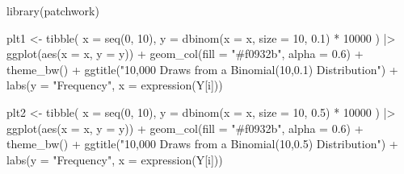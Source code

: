 \documentclass[
  letterpaper,
  DIV=11,
  numbers=noendperiod]{scrreport}
\newenvironment{Shaded}{\begin{snugshade}}{\end{snugshade}}
\newcommand{\AttributeTok}[1]{\textcolor[rgb]{0.40,0.45,0.13}{#1}}
\newcommand{\DecValTok}[1]{\textcolor[rgb]{0.68,0.00,0.00}{#1}}
\newcommand{\FloatTok}[1]{\textcolor[rgb]{0.68,0.00,0.00}{#1}}
\newcommand{\FunctionTok}[1]{\textcolor[rgb]{0.28,0.35,0.67}{#1}}
\newcommand{\NormalTok}[1]{\textcolor[rgb]{0.00,0.23,0.31}{#1}}
\newcommand{\OtherTok}[1]{\textcolor[rgb]{0.00,0.23,0.31}{#1}}
\newcommand{\SpecialCharTok}[1]{\textcolor[rgb]{0.37,0.37,0.37}{#1}}
\newcommand{\StringTok}[1]{\textcolor[rgb]{0.13,0.47,0.30}{#1}}
\begin{document}
\begin{Shaded}
\begin{Highlighting}[]
\FunctionTok{library}\NormalTok{(patchwork)}

\NormalTok{plt1 }\OtherTok{\textless{}{-}} \FunctionTok{tibble}\NormalTok{(}
  \AttributeTok{x =} \FunctionTok{seq}\NormalTok{(}\DecValTok{0}\NormalTok{, }\DecValTok{10}\NormalTok{),}
  \AttributeTok{y =} \FunctionTok{dbinom}\NormalTok{(}\AttributeTok{x =}\NormalTok{ x, }\AttributeTok{size =} \DecValTok{10}\NormalTok{, }\FloatTok{0.1}\NormalTok{) }\SpecialCharTok{*} \DecValTok{10000}
\NormalTok{) }\SpecialCharTok{|\textgreater{}} 
\FunctionTok{ggplot}\NormalTok{(}\FunctionTok{aes}\NormalTok{(}\AttributeTok{x =}\NormalTok{ x, }\AttributeTok{y =}\NormalTok{ y)) }\SpecialCharTok{+} 
\FunctionTok{geom\_col}\NormalTok{(}\AttributeTok{fill =} \StringTok{"\#f0932b"}\NormalTok{, }\AttributeTok{alpha =} \FloatTok{0.6}\NormalTok{) }\SpecialCharTok{+} 
\FunctionTok{theme\_bw}\NormalTok{() }\SpecialCharTok{+} 
\FunctionTok{ggtitle}\NormalTok{(}\StringTok{"10,000 Draws from a Binomial(10,0.1) Distribution"}\NormalTok{) }\SpecialCharTok{+} 
\FunctionTok{labs}\NormalTok{(}\AttributeTok{y =} \StringTok{"Frequency"}\NormalTok{, }\AttributeTok{x =} \FunctionTok{expression}\NormalTok{(Y[i]))}

\NormalTok{plt2 }\OtherTok{\textless{}{-}} \FunctionTok{tibble}\NormalTok{(}
  \AttributeTok{x =} \FunctionTok{seq}\NormalTok{(}\DecValTok{0}\NormalTok{, }\DecValTok{10}\NormalTok{),}
  \AttributeTok{y =} \FunctionTok{dbinom}\NormalTok{(}\AttributeTok{x =}\NormalTok{ x, }\AttributeTok{size =} \DecValTok{10}\NormalTok{, }\FloatTok{0.5}\NormalTok{) }\SpecialCharTok{*} \DecValTok{10000}
\NormalTok{) }\SpecialCharTok{|\textgreater{}} 
\FunctionTok{ggplot}\NormalTok{(}\FunctionTok{aes}\NormalTok{(}\AttributeTok{x =}\NormalTok{ x, }\AttributeTok{y =}\NormalTok{ y)) }\SpecialCharTok{+} 
\FunctionTok{geom\_col}\NormalTok{(}\AttributeTok{fill =} \StringTok{"\#f0932b"}\NormalTok{, }\AttributeTok{alpha =} \FloatTok{0.6}\NormalTok{) }\SpecialCharTok{+} 
\FunctionTok{theme\_bw}\NormalTok{() }\SpecialCharTok{+} 
\FunctionTok{ggtitle}\NormalTok{(}\StringTok{"10,000 Draws from a Binomial(10,0.5) Distribution"}\NormalTok{) }\SpecialCharTok{+} 
\FunctionTok{labs}\NormalTok{(}\AttributeTok{y =} \StringTok{"Frequency"}\NormalTok{, }\AttributeTok{x =} \FunctionTok{expression}\NormalTok{(Y[i]))}


\end{Highlighting}
\end{Shaded}
\end{document}
